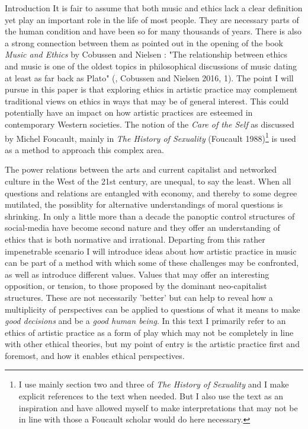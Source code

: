 \documentclass[presentation]{beamer}
\makeatletter
\newcommand{\cslcitation}[2]
 {\protect\hyper@linkstart{cite}{citeproc_bib_item_#1}#2\hyper@linkend}
\makeatother
\begin{document}
\begin{frame}[label={sec:org669441d}]{Introduction}
It is fair to assume that both music and ethics lack a clear definition yet play an important role in the life of most people. They are necessary parts of the human condition and have been so for many thousands of years. There is also a strong connection between them as pointed out in the opening of the book \emph{Music and Ethics} by Cobussen and Nielsen : "The relationship between ethics and music is one of the oldest topics in philosophical discussions of music dating at least as far back as Plato"  (, \cslcitation{4}{Cobussen and Nielsen 2016, 1}). The point I will pursue in this paper is that exploring ethics in artistic practice may complement traditional views on ethics in ways that may be of general interest. This could potentially have an impact on how artistic practices are esteemed in contemporary Western societies. The notion of the \emph{Care of the Self} as discussed by Michel Foucault, mainly in \emph{The History of Sexuality} (\cslcitation{7}{Foucault 1988})\footnote{I use mainly section two and three of \emph{The History of Sexuality} and I make explicit references to the text when needed. But I also use the text as an inspiration and have allowed myself to make interpretations that may not be in line with those a Foucault scholar would do here necessary.} is used as a method to approach this complex area.

The power relations between the arts and current capitalist and networked culture in the West of the 21st century, are unequal, to say the least. When all questions and relations are entangled with economy, and thereby to some degree mutilated, the possiblity for alternative understandings of moral questions is shrinking. In only a little more than a decade the panoptic control structures of social-media have become second nature and they offer an understanding of ethics that is both normative and irrational. Departing from this rather impenetrable scenario I will introduce ideas about how artistic practice in music can be part of a method with which some of these challenges may be confronted, as well as introduce different values. Values that may offer an interesting opposition, or tension, to those proposed by the dominant neo-capitalist structures. These are not necessarily 'better' but can help to reveal how a multiplicity of perspectives can be applied to questions of what it means to make \emph{good decisions} and be a \emph{good human being}. In this text I primarily refer to an ethics of artistic practice as a form of play which may not be completely in line with other ethical theories, but my point of entry is the artistic practice first and foremost, and how it enables ethical perspectives.


\end{frame}
\end{document}

